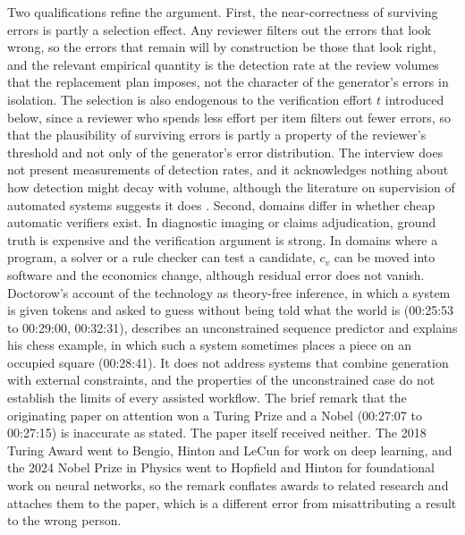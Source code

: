 \documentclass[12pt]{article}
\newcommand{\ts}[1]{(#1)}
\begin{document}
Two qualifications refine the argument. First, the near-correctness of surviving errors is partly a selection effect. Any reviewer filters out the errors that look wrong, so the errors that remain will by construction be those that look right, and the relevant empirical quantity is the detection rate at the review volumes that the replacement plan imposes, not the character of the generator's errors in isolation. The selection is also endogenous to the verification effort $t$ introduced below, since a reviewer who spends less effort per item filters out fewer errors, so that the plausibility of surviving errors is partly a property of the reviewer's threshold and not only of the generator's error distribution. The interview does not present measurements of detection rates, and it acknowledges nothing about how detection might decay with volume, although the literature on supervision of automated systems suggests it does \cite{bainbridge}. Second, domains differ in whether cheap automatic verifiers exist. In diagnostic imaging or claims adjudication, ground truth is expensive and the verification argument is strong. In domains where a program, a solver or a rule checker can test a candidate, $c_v$ can be moved into software and the economics change, although residual error does not vanish. Doctorow's account of the technology as theory-free inference, in which a system is given tokens and asked to guess without being told what the world is \ts{00:25:53 to 00:29:00, 00:32:31}, describes an unconstrained sequence predictor and explains his chess example, in which such a system sometimes places a piece on an occupied square \ts{00:28:41}. It does not address systems that combine generation with external constraints, and the properties of the unconstrained case do not establish the limits of every assisted workflow. The brief remark that the originating paper on attention \cite{vaswani} won a Turing Prize and a Nobel \ts{00:27:07 to 00:27:15} is inaccurate as stated. The paper itself received neither. The 2018 Turing Award went to Bengio, Hinton and LeCun for work on deep learning, and the 2024 Nobel Prize in Physics went to Hopfield and Hinton for foundational work on neural networks, so the remark conflates awards to related research and attaches them to the paper, which is a different error from misattributing a result to the wrong person.
\end{document}
